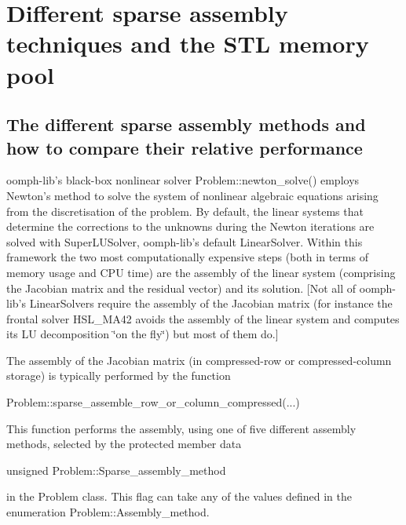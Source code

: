  

\hypertarget{index_assembly}{}\section{Different sparse assembly techniques and the S\-T\-L memory pool}\label{index_assembly}
\hypertarget{index_assembly_methods}{}\subsection{The different sparse assembly methods and how to compare their relative performance}\label{index_assembly_methods}
{\ttfamily oomph-\/lib's} black-\/box nonlinear solver {\ttfamily Problem\-::newton\-\_\-solve()} employs Newton's method to solve the system of nonlinear algebraic equations arising from the discretisation of the problem. By default, the linear systems that determine the corrections to the unknowns during the Newton iterations are solved with {\ttfamily Super\-L\-U\-Solver}, {\ttfamily oomph-\/lib's} default {\ttfamily Linear\-Solver}. Within this framework the two most computationally expensive steps (both in terms of memory usage and C\-P\-U time) are the assembly of the linear system (comprising the Jacobian matrix and the residual vector) and its solution. \mbox{[}Not all of {\ttfamily oomph-\/lib's} {\ttfamily Linear\-Solvers} require the assembly of the Jacobian matrix (for instance the frontal solver {\ttfamily H\-S\-L\-\_\-\-M\-A42} avoids the assembly of the linear system and computes its L\-U decomposition \char`\"{}on the fly\char`\"{}) but most of them do.\mbox{]}

The assembly of the Jacobian matrix (in compressed-\/row or compressed-\/column storage) is typically performed by the function


\begin{DoxyCode}
Problem::sparse\_assemble\_row\_or\_column\_compressed(...)
\end{DoxyCode}


This function performs the assembly, using one of five different assembly methods, selected by the protected member data


\begin{DoxyCode}
\textcolor{keywordtype}{unsigned} Problem::Sparse\_assembly\_method
\end{DoxyCode}


in the {\ttfamily Problem} class. This flag can take any of the values defined in the enumeration {\ttfamily Problem\-::\-Assembly\-\_\-method}.

